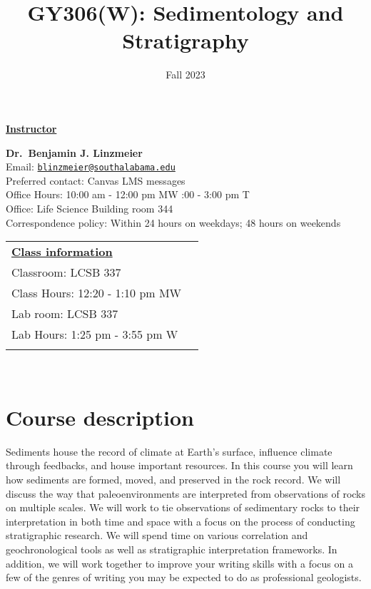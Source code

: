 \documentclass[11pt,]{article}
\title{GY306(W): Sedimentology and Stratigraphy}
\date{Fall 2023}
\begin{document}
  

		\maketitle
		
	
		\thispagestyle{firststyle}

\textbf{\underline{Instructor}}
\begin{multicols}{2}

  \textbf{Dr.~Benjamin J. Linzmeier}\\
  Email: \href{mailto:blinzmeier@southalabama.edu}{\nolinkurl{blinzmeier@southalabama.edu}}\\
  Preferred contact: Canvas LMS messages\\
  Office Hours: 10:00 am - 12:00 pm MW :00 - 3:00 pm T\\
  Office: Life Science Building room 344\\
  Correspondence policy: Within 24 hours on weekdays; 48 hours on
weekends\\
    \columnbreak
    
  \end{multicols}
	
\noindent \begin{tabular*}{\textwidth}{ @{\extracolsep{\fill}} lr @{\extracolsep{\fill}}}
\textbf{\underline{Class information}}\\
  Classroom: LCSB 337\\
  Class Hours: 12:20 - 1:10 pm MW\\
    Lab room: LCSB 337\\
  Lab Hours: 1:25 pm - 3:55 pm W\\
    \\
	\end{tabular*}\\


\vspace{2mm}


\hypertarget{course-description}{%
\section{Course description}\label{course-description}}

Sediments house the record of climate at Earth's surface, influence
climate through feedbacks, and house important resources. In this course
you will learn how sediments are formed, moved, and preserved in the
rock record. We will discuss the way that paleoenvironments are
interpreted from observations of rocks on multiple scales. We will work
to tie observations of sedimentary rocks to their interpretation in both
time and space with a focus on the process of conducting stratigraphic
research. We will spend time on various correlation and geochronological
tools as well as stratigraphic interpretation frameworks. In addition,
we will work together to improve your writing skills with a focus on a
few of the genres of writing you may be expected to do as professional
geologists.
\end{document}
